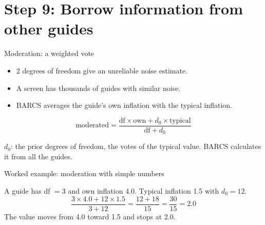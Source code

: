 \documentclass[aspectratio=169,11pt]{beamer}
\begin{document}
\section{Step 9: Borrow information from other guides}

\begin{frame}{Moderation: a weighted vote}
\begin{itemize}
\item 2 degrees of freedom give an unreliable noise estimate.
\item A screen has thousands of guides with similar noise.
\item BARCS averages the guide's own inflation with the typical inflation.
\end{itemize}
\[
\text{moderated} = \frac{\text{df} \times \text{own} + d_0 \times \text{typical}}{\text{df} + d_0}
\]
\begin{symbols}
\small $d_0$: the \alert{prior degrees of freedom}, the votes of the typical
value. BARCS calculates it from all the guides.
\end{symbols}
\end{frame}

\begin{frame}{Worked example: moderation with simple numbers}
\begin{worked}[ 15]
A guide has df $= 3$ and own inflation 4.0. Typical inflation 1.5 with
$d_0 = 12$.
\[
\frac{3 \times 4.0 + 12 \times 1.5}{3 + 12} = \frac{12 + 18}{15}
 = \frac{30}{15} = 2.0
\]
The value moves from 4.0 toward 1.5 and stops at 2.0.
\end{worked}
\end{frame}
\end{document}
